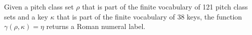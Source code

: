 
Given a pitch class set $\rho$ that is part of the finite
vocabulary of 121 pitch class sets and a key $\kappa$ that
is part of the finite vocabulary of 38 keys, the function
$\gamma(\rho, \kappa) = \eta$ returns a Roman numeral label.
